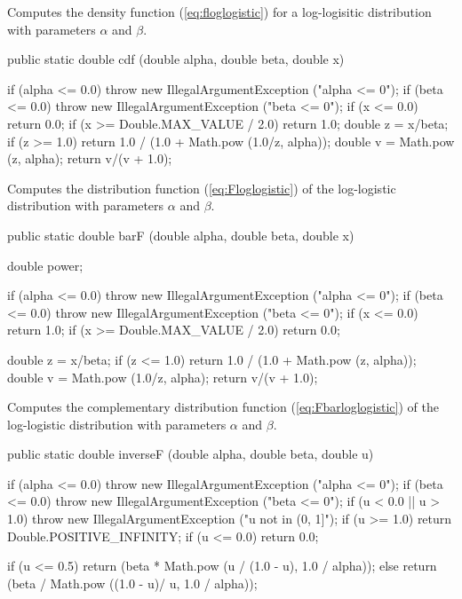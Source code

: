 \begin{tabb} Computes the density function (\ref{eq:floglogistic})
  for a log-logisitic distribution with parameters $\alpha$
  and $\beta$.
\end{tabb}
\begin{code}

   public static double cdf (double alpha, double beta, double x)\begin{hide} {
      if (alpha <= 0.0)
         throw new IllegalArgumentException ("alpha <= 0");
      if (beta <= 0.0)
         throw new IllegalArgumentException ("beta <= 0");
      if (x <= 0.0)
         return 0.0;
      if (x >= Double.MAX_VALUE / 2.0)
         return 1.0;
      double z = x/beta;
      if (z >= 1.0)
         return 1.0 / (1.0 + Math.pow (1.0/z, alpha));
      double v = Math.pow (z, alpha);
      return v/(v + 1.0);
   }\end{hide}
\end{code}
 \begin{tabb}
   Computes the distribution function (\ref{eq:Floglogistic}) of the
   log-logistic distribution with parameters $\alpha$ and $\beta$.
 \end{tabb}
\begin{code}

   public static double barF (double alpha, double beta, double x)\begin{hide} {
      double power;

      if (alpha <= 0.0)
         throw new IllegalArgumentException ("alpha <= 0");
      if (beta <= 0.0)
         throw new IllegalArgumentException ("beta <= 0");
      if (x <= 0.0)
         return 1.0;
      if (x >= Double.MAX_VALUE / 2.0)
         return 0.0;

      double z = x/beta;
      if (z <= 1.0)
         return 1.0 / (1.0 + Math.pow (z, alpha));
      double v = Math.pow (1.0/z, alpha);
      return v/(v + 1.0);
   }\end{hide}
\end{code}
  \begin{tabb}
   Computes the complementary distribution function (\ref{eq:Fbarloglogistic})
   of the log-logistic distribution with parameters $\alpha$ and $\beta$.
 \end{tabb}
\begin{code}

   public static double inverseF (double alpha, double beta, double u)\begin{hide} {
      if (alpha <= 0.0)
         throw new IllegalArgumentException ("alpha <= 0");
      if (beta <= 0.0)
         throw new IllegalArgumentException ("beta <= 0");
      if (u < 0.0 || u > 1.0)
         throw new IllegalArgumentException ("u not in (0, 1]");
      if (u >= 1.0)
         return Double.POSITIVE_INFINITY;
      if (u <= 0.0)
         return 0.0;

      if (u <= 0.5)
         return (beta * Math.pow (u / (1.0 - u), 1.0 / alpha));
      else
         return (beta / Math.pow ((1.0 - u)/ u, 1.0 / alpha));
   }\end{hide}
\end{code}
